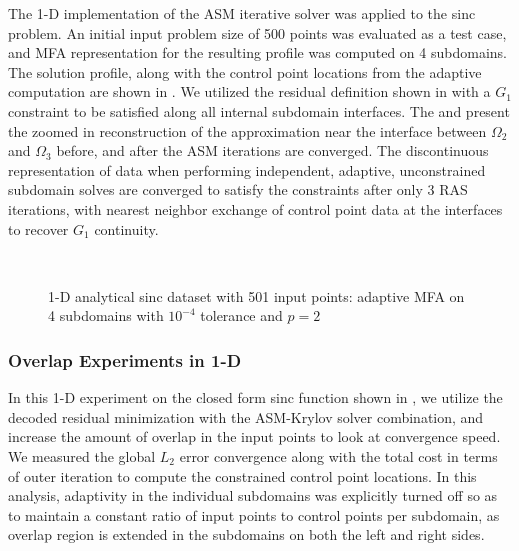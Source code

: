 The 1-D implementation of the ASM iterative solver was applied to the sinc problem. An initial input problem size of 500 points was evaluated as a test case, and MFA representation for the resulting profile was computed on 4 subdomains. The solution profile, along with the control point locations from the adaptive computation are shown in . We utilized the residual definition shown in  with a $G_1$ constraint to be satisfied along all internal subdomain interfaces. The  and  present the zoomed in reconstruction of the approximation near the interface between $\Omega_2$ and $\Omega_3$ before, and after the ASM iterations are converged. The discontinuous representation of data when performing independent, adaptive, unconstrained subdomain solves are converged to satisfy the constraints after only 3 RAS iterations, with nearest neighbor exchange of control point data at the interfaces to recover $G_1$ continuity.

\begin{figure}
	\centering
	\hfill
	\\
	\caption{1-D analytical sinc dataset with 501 input points: adaptive MFA on 4 subdomains with $10^{-4}$ 	tolerance and $p=2$}
	\label{fig:sinc-adaptive}
\end{figure}

%

\subsubsection{Overlap Experiments in 1-D}

In this 1-D experiment on the closed form sinc function shown in , we utilize the decoded residual minimization with the ASM-Krylov solver combination, and increase the amount of overlap in the input points to look at convergence speed. We measured the global $L_2$ error convergence along with the total cost in terms of outer iteration to compute the constrained control point locations. In this analysis, adaptivity in the individual subdomains was explicitly turned off so as to maintain a constant ratio of input points to control points per subdomain, as overlap region is extended in the subdomains on both the left and right sides.

